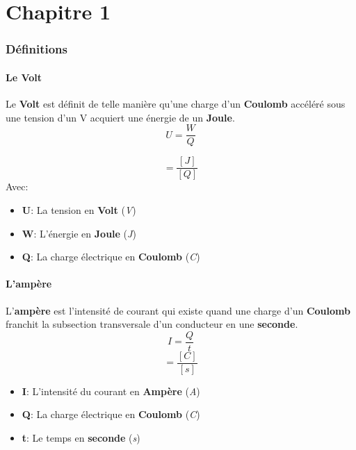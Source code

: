 \part{Chapitre 1}
 \section{Définitions}
 \subsection{Le Volt}
 Le \textbf{Volt} est définit de telle manière qu'une charge d'un \textbf{Coulomb} accéléré sous une tension d'un V acquiert une énergie de un \textbf{Joule}.\\
 \begin{equation}
	 U = \frac{W}{Q}
 \end{equation}

 \begin{equation}
	 [V] = \frac{[J]}{[Q]}
 \end{equation}
 Avec:
 \begin{itemize}
	 \item \textbf{U}: La tension en \textbf{Volt} (\textit{V})
	 \item \textbf{W}: L'énergie en \textbf{Joule} (\textit{J})
	 \item \textbf{Q}: La charge électrique en \textbf{Coulomb} (\textit{C})
 \end{itemize}

 \subsection{L'ampère}
 L'\textbf{ampère} est l'intensité de courant qui existe quand une charge d'un \textbf{Coulomb} franchit la subsection transversale d'un conducteur en une \textbf{seconde}.\\
 \begin{equation}
	 I = \frac{Q}{t}
 \end{equation}
 \begin{equation}
	 [A] = \frac{[C]}{[s]}
 \end{equation}

 \begin{itemize}
	 \item \textbf{I}: L'intensité du courant en \textbf{Ampère} (\textit{A})
	 \item \textbf{Q}: La charge électrique en \textbf{Coulomb} (\textit{C})
	 \item \textbf{t}: Le temps en \textbf{seconde} (\textit{s})
 \end{itemize}

